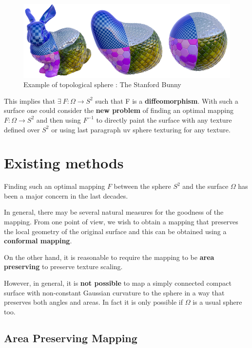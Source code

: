 \documentclass[11pt,a4paper]{article}
\begin{document}
\vskip 0.3cm
\begin{figure}[H]
   \centering
   \includegraphics[width=12cm]{3.png}
   \caption{Example of topological sphere : The Stanford Bunny}
\end{figure}
\vskip 0.3cm

This implies that $\exists\ F : \Omega \to S^2$ such that F is a \textbf{diffeomorphism}.
With such a surface one could consider the \textbf{new problem} of finding an optimal mapping $F : \Omega \to S^2$ and then using $F^{-1}$ to directly paint the surface with any texture defined over $S^2$ or using last paragraph uv sphere texturing for any texture.

\section{Existing methods}

Finding such an optimal mapping $F$ between the sphere $S^2$ and the surface $\Omega$ has been a major concern in the last decades.

\vskip 0.3cm

In general, there may be several natural measures for the goodness of the mapping. 
From one point of view, we wish to obtain a mapping that preserves the local geometry of the original
surface and this can be obtained using a \textbf{conformal mapping}.

\vskip 0.3cm

On the other hand, it is reasonable to require the mapping to be \textbf{area preserving} to preserve texture scaling.

\vskip 0.3cm

However, in general, it is \textbf{not possible} to map a simply connected compact surface with non-constant Gaussian curvature to the sphere in a way that preserves both angles and areas. In fact it is only possible if $\Omega$ is a usual sphere too.

\subsection{Area Preserving Mapping}
\end{document}
